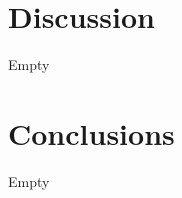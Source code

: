 \documentclass[aps,pra,preprint,groupedaddress]{revtex4-1}
\begin{document}
%

\section{\label{sec:disc} Discussion}

Empty

\section{\label{sec:conc} Conclusions}

Empty


%
\end{document}
